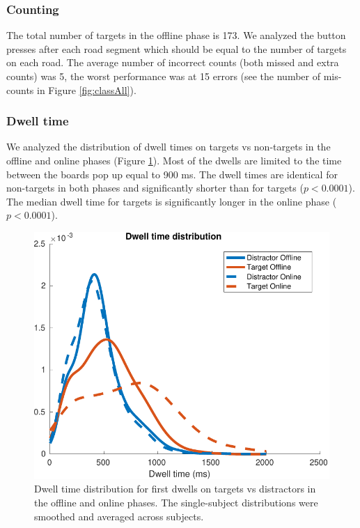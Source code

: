 \documentclass[12pt]{iopart}
\begin{document}
\subsubsection*{Counting}
The total number of targets in the offline phase is 173.
We analyzed the button presses after each road segment
which should be equal to the number of targets
on each road.
The average number of incorrect counts (both missed and extra counts) was 5,
the worst performance was at 15 errors (see the number of mis-counts in Figure \ref{fig:classAll}).


\subsubsection*{Dwell time}
We analyzed the distribution of dwell times on targets vs non-targets
in the offline and online phases (Figure \ref{fig:dwell}). 
Most of the dwells are limited to the time between the boards pop up equal to 900 ms.
The dwell times are identical for non-targets in both phases and significantly
shorter than for targets ($p < 0.0001$).
The median dwell time for targets is significantly longer in the online phase ($p < 0.0001$).

\begin{figure}[!t]
    \includegraphics[trim={0cm 0cm 0cm 0cm},clip,width=0.6\columnwidth]{../images/DwelltimeDist_online_allmean.pdf}
    \caption{Dwell time distribution for first dwells on
    targets vs distractors in the offline and online phases. The single-subject
    distributions were smoothed and averaged across subjects.}
\label{fig:dwell}
\end{figure}
\end{document}

